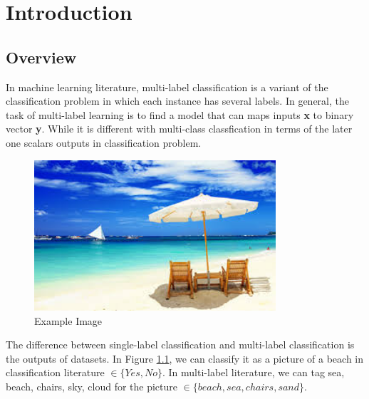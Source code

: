 
\chapter{Introduction} %
\label{Chapter5}


\section{Overview}

In machine learning literature, multi-label classification is a variant of the classification problem in which each instance has several labels. In general, the task of multi-label learning is to find a model that can maps inputs \textbf{x} to binary vector \textbf{y}. While it is different with multi-class classfication in terms of the later one scalars outputs in classification problem.

\graphicspath{ {./Figures/} }
\begin{figure}[!htb]
    \centering
	\includegraphics[width=0.8\textwidth]{beach.jpg}
    \caption{Example Image}%
    \label{fig:MultilableImage}%
\end{figure}

The difference between single-label classification and multi-label classification is the outputs of datasets.
In Figure \ref{fig:MultilableImage}, we can classify it as a picture of a beach in classification literature $\in \{Yes, No\}$. In multi-label literature, we can tag sea, beach, chairs, sky, cloud for the picture $\in \{beach, sea, chairs, sand\}$.

